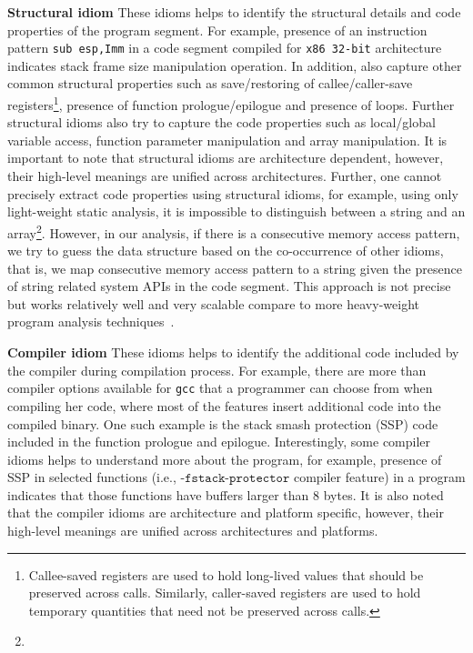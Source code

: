\noindent \textbf{Structural idiom}
These idioms helps to identify the structural details and code properties of the program segment. For example, presence of an instruction pattern \texttt{sub esp,Imm} in a code segment compiled for \texttt{x86 32-bit} architecture indicates stack frame size manipulation operation. In addition, also capture other common structural properties such as save/restoring of callee/caller-save registers\footnote{Callee-saved registers are used to hold long-lived values that should be preserved across calls. Similarly, caller-saved registers are used to hold temporary quantities that need not be preserved across calls.}, presence of function prologue/epilogue and presence of loops. Further structural idioms also try to capture the code properties such as local/global variable access, function parameter manipulation and array manipulation.  It is important to note that structural idioms are architecture dependent, however, their high-level meanings are unified across architectures. Further, one cannot precisely extract code properties using structural idioms, for example, using only light-weight static analysis, it is impossible to distinguish between a string and an array\footnote{}. However, in our analysis, if there is a consecutive memory access pattern, we try to guess the data structure based on the co-occurrence of other idioms, that is, we map consecutive memory access pattern to a string given the presence of string related system APIs in the code segment. This approach is not precise but works relatively well and very scalable compare to more heavy-weight program analysis techniques~\cite{balakrishnan2007divine}.

\noindent \textbf{Compiler idiom}
These idioms helps to identify the additional code included by the compiler during compilation process. For example, there are more than  compiler options available for \texttt{gcc} that a programmer can choose from when compiling her code, where most of the features insert additional code into the compiled binary. One such example is the stack smash protection (SSP) code included in the function prologue and epilogue. Interestingly, some compiler idioms helps to understand more about the program, for example, presence of SSP in selected functions (i.e., -$\mathtt{fstack}$-$\mathtt{protector}$ compiler feature) in a program indicates that those functions have buffers larger than 8 bytes. It is also noted that the compiler idioms are architecture and platform specific, however, their high-level meanings are unified across architectures and platforms.

